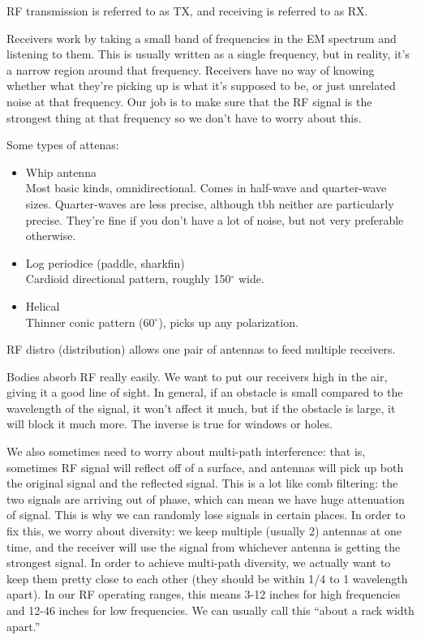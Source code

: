 \documentclass[a4paper]{article}
\begin{document}
RF transmission is referred to as TX, and receiving is referred to as RX.

Receivers work by taking a small band of frequencies in the EM spectrum and
listening to them. This is usually written as a single frequency, but in
reality, it's a narrow region around that frequency. Receivers have no way of
knowing whether what they're picking up is what it's supposed to be, or just
unrelated noise at that frequency. Our job is to make sure that the RF signal
is the strongest thing at that frequency so we don't have to worry about this.

Some types of attenas:
\begin{itemize}
	\item Whip antenna\\
		Most basic kinds, omnidirectional. Comes in half-wave and
		quarter-wave sizes. Quarter-waves are less precise, although
		tbh neither are particularly precise. They're fine if you don't
		have a lot of noise, but not very preferable otherwise.
	\item Log periodice (paddle, sharkfin)\\
		Cardioid directional pattern, roughly 150$^\circ$ wide.
	\item Helical\\
		Thinner conic pattern (60$^\circ$), picks up any polarization.
\end{itemize}

RF distro (distribution) allows one pair of antennas to feed multiple
receivers.

Bodies absorb RF really easily. We want to put our receivers high in the air,
giving it a good line of sight. In general, if an obstacle is small compared to
the wavelength of the signal, it won't affect it much, but if the obstacle is
large, it will block it much more. The inverse is true for windows or holes.

We
also sometimes need to worry about multi-path interference: that is, sometimes
RF signal
will reflect off of a surface, and antennas will pick up both the original
signal and the reflected signal. This is a lot like comb filtering: the two
signals are arriving out of phase, which can mean we have huge attenuation of
signal. This is why we can randomly lose signals in certain places. In order to
fix this, we worry about diversity: we keep multiple (usually 2) antennas at
one time, and the receiver will use the signal from whichever antenna is
getting the strongest signal. In order to achieve multi-path diversity, we
actually want to keep them pretty close to each other (they should be within
1/4 to 1 wavelength apart). In our RF operating ranges, this means 3-12 inches
for high frequencies and 12-46 inches for low frequencies. We can usually call
this ``about a rack width apart.''
\end{document}
